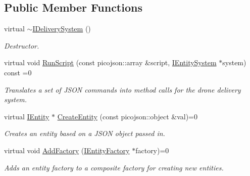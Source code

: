 \subsection*{Public Member Functions}
\begin{DoxyCompactItemize}
\item 
\mbox{\label{classcsci3081_1_1IDeliverySystem_a756634386c8a889ca93ba0e2fc960155}} 
virtual \hyperlink{classcsci3081_1_1IDeliverySystem_a756634386c8a889ca93ba0e2fc960155}{$\sim$\+I\+Delivery\+System} ()
\begin{DoxyCompactList}\small\item\em Destructor. \end{DoxyCompactList}\item 
virtual void \hyperlink{classcsci3081_1_1IDeliverySystem_ae152276130e859b052f1d89417be6fc2}{Run\+Script} (const picojson\+::array \&script, \hyperlink{classentity__project_1_1IEntitySystem}{I\+Entity\+System} $\ast$system) const =0
\begin{DoxyCompactList}\small\item\em Translates a set of J\+S\+ON commands into method calls for the drone delivery system. \end{DoxyCompactList}\item 
virtual \hyperlink{classentity__project_1_1IEntity}{I\+Entity} $\ast$ \hyperlink{classcsci3081_1_1IDeliverySystem_abc1959b16d1fcfdeea2a2d8af0733301}{Create\+Entity} (const picojson\+::object \&val)=0
\begin{DoxyCompactList}\small\item\em Creates an entity based on a J\+S\+ON object passed in. \end{DoxyCompactList}\item 
\mbox{\label{classcsci3081_1_1IDeliverySystem_a4d6a5fa94ab597dbe88ae0046d698e76}} 
virtual void \hyperlink{classcsci3081_1_1IDeliverySystem_a4d6a5fa94ab597dbe88ae0046d698e76}{Add\+Factory} (\hyperlink{classentity__project_1_1IEntityFactory}{I\+Entity\+Factory} $\ast$factory)=0
\begin{DoxyCompactList}\small\item\em Adds an entity factory to a composite factory for creating new entities. \end{DoxyCompactList}\item 
\mbox{\label{classcsci3081_1_1IDeliverySystem_ae8fe57f0627f3429d4a8cea4d910e233}} 

\end{DoxyCompactItemize}
